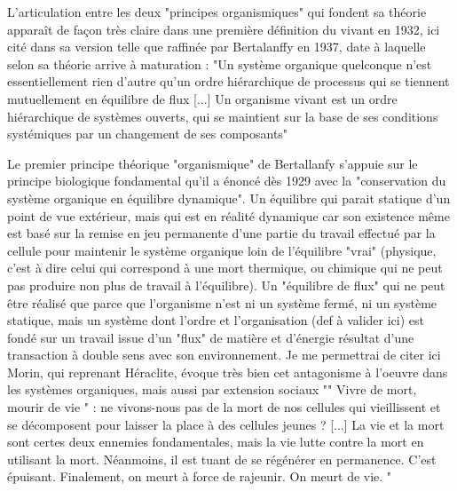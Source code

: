 {%

L'articulation entre les deux "principes organismiques" qui fondent sa théorie apparaît de façon très claire dans une première définition du vivant en 1932, ici cité dans sa version telle que raffinée par Bertalanffy en 1937, date à laquelle selon \autocite{Pouvreau2013} sa théorie arrive à maturation : "Un système organique quelconque n'est essentiellement rien d'autre qu'un ordre hiérarchique de processus qui se tiennent mutuellement en équilibre de flux [...] Un organisme vivant est un ordre hiérarchique de systèmes ouverts, qui se maintient sur la base de ses conditions systémiques par un changement de ses composants"


Le premier principe théorique "organismique" de Bertallanfy s'appuie sur le principe biologique fondamental qu'il a énoncé dès 1929 avec la "conservation du système organique en équilibre dynamique". Un équilibre qui parait statique d'un point de vue extérieur, mais qui est en réalité dynamique car son existence même est basé sur la remise en jeu permanente d'une partie du travail effectué par la cellule pour maintenir le système organique loin de l'équilibre "vrai" (physique, c'est à dire celui qui correspond à une mort thermique, ou chimique qui ne peut pas produire non plus de travail à l'équilibre). Un "équilibre de flux" qui ne peut être réalisé que parce que l'organisme n'est ni un système fermé, ni un système statique, mais un système dont l'ordre et l'organisation (def à valider ici) est fondé sur un travail issue d'un "flux" de matière et d'énergie résultat d'une transaction à double sens avec son environnement. \autocite[472]{Pouvreau2013} Je me permettrai de citer ici Morin, qui reprenant Héraclite, évoque très bien cet antagonisme à l'oeuvre dans les systèmes organiques, mais aussi par extension sociaux "" Vivre de mort, mourir de vie " : ne vivons-nous pas de la mort de nos cellules qui vieillissent et se décomposent pour laisser la place à des cellules jeunes ? [...] La vie et la mort sont certes deux ennemies fondamentales, mais la vie lutte contre la mort en utilisant la mort. Néanmoins, il est tuant de se régénérer en permanence. C’est épuisant. Finalement, on meurt à force de rajeunir. On meurt de vie. " \autocite{MorinXX} 

}
